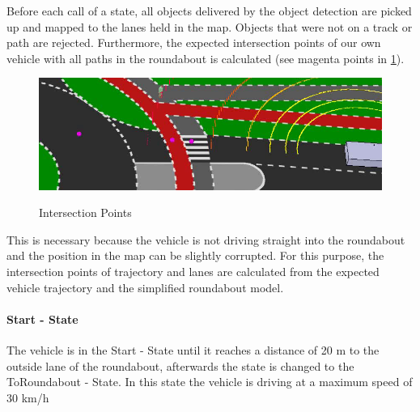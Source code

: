 \documentclass[11pt,oneside,openright]{mpreport}
\begin{document}
Before each call of a state, all objects delivered by the object detection are picked up and mapped to the lanes held in the map.
Objects that were not on a track or path are rejected.
Furthermore, the expected intersection points of our own vehicle with all paths in the roundabout is calculated (see magenta points in \cref{intersection_pos}). 
\begin{figure}[!ht]
\begin{center}
\caption{Intersection Points}
\includegraphics[width=\textwidth]{bilder/intersection_pos.png}
\label{intersection_pos}
\end{center}
\end{figure}
This is necessary because the vehicle is not driving straight into the roundabout and the position in the map can be slightly corrupted. For this purpose,
the intersection points of trajectory and lanes are calculated from the expected vehicle trajectory and the simplified roundabout model.

\paragraph{Start - State}

The vehicle is in the Start - State until it reaches a distance of 20 m to the outside lane of the roundabout, afterwards the state is changed to the ToRoundabout - State.
In this state the vehicle is driving at a maximum speed of 30 km/h
\end{document}
